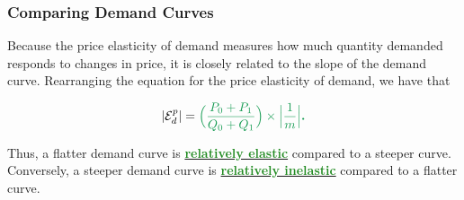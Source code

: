 \documentclass[11pt]{article}\usepackage[]{graphicx}\usepackage[]{color}
\theoremstyle{definition}
\newcommand{\ddp}[1]{{\textbf{\textcolor{ForestGreen}{#1}}}}
\newcommand{\dd}[1]{{\underline{\textbf{\textcolor{ForestGreen}{#1}}}}}
\begin{document}
	
	\subsubsection*{Comparing Demand Curves}
	
	
	Because the price elasticity of demand measures how much quantity demanded responds to changes in price, it is closely related to the slope of the demand curve. Rearranging the equation for the price elasticity of demand, we have that
	
	\begin{equation*}
	|\mathcal{E}_d^p|= \ddp{$\Big(\frac{P_0 + P_1}{Q_0 + Q_1}\Big) \times \Big|\frac{1}{m}\Big|$.}
	\end{equation*}

	Thus, a flatter demand curve is \dd{relatively elastic} compared to a steeper curve. 
	\\
	
	Conversely, a steeper demand curve is  \dd{relatively inelastic} compared to a flatter curve.
	\\
	
\end{document}
